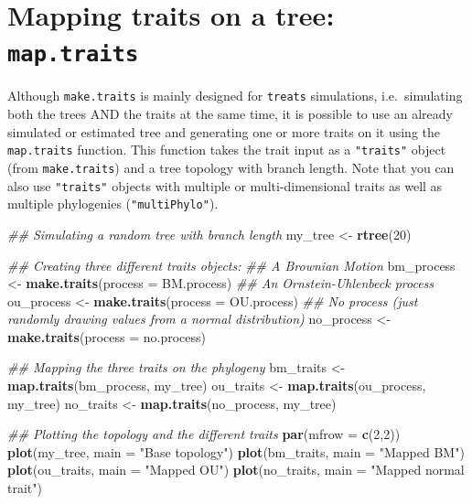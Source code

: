 \documentclass[
]{book}
\newenvironment{Shaded}{\begin{snugshade}}{\end{snugshade}}
\newcommand{\CommentTok}[1]{\textcolor[rgb]{0.56,0.35,0.01}{\textit{#1}}}
\newcommand{\DataTypeTok}[1]{\textcolor[rgb]{0.13,0.29,0.53}{#1}}
\newcommand{\DecValTok}[1]{\textcolor[rgb]{0.00,0.00,0.81}{#1}}
\newcommand{\KeywordTok}[1]{\textcolor[rgb]{0.13,0.29,0.53}{\textbf{#1}}}
\newcommand{\NormalTok}[1]{#1}
\newcommand{\StringTok}[1]{\textcolor[rgb]{0.31,0.60,0.02}{#1}}
\begin{document}
\hypertarget{mapping-traits-on-a-tree-map.traits}{%
\section{\texorpdfstring{Mapping traits on a tree: \texttt{map.traits}}{Mapping traits on a tree: map.traits}}\label{mapping-traits-on-a-tree-map.traits}}

Although \texttt{make.traits} is mainly designed for \texttt{treats} simulations, i.e.~simulating both the trees AND the traits at the same time, it is possible to use an already simulated or estimated tree and generating one or more traits on it using the \texttt{map.traits} function. This function takes the trait input as a \texttt{"traits"} object (from \texttt{make.traits}) and a tree topology with branch length. Note that you can also use \texttt{"traits"} objects with multiple or multi-dimensional traits as well as multiple phylogenies (\texttt{"multiPhylo"}).

\begin{Shaded}
\begin{Highlighting}[]
\CommentTok{\#\# Simulating a random tree with branch length}
\NormalTok{my\_tree \textless{}{-}}\StringTok{ }\KeywordTok{rtree}\NormalTok{(}\DecValTok{20}\NormalTok{)}

\CommentTok{\#\# Creating three different traits objects:}
\CommentTok{\#\# A Brownian Motion}
\NormalTok{bm\_process \textless{}{-}}\StringTok{ }\KeywordTok{make.traits}\NormalTok{(}\DataTypeTok{process =}\NormalTok{ BM.process)}
\CommentTok{\#\# An Ornstein{-}Uhlenbeck process}
\NormalTok{ou\_process \textless{}{-}}\StringTok{ }\KeywordTok{make.traits}\NormalTok{(}\DataTypeTok{process =}\NormalTok{ OU.process)}
\CommentTok{\#\# No process (just randomly drawing values from a normal distribution)}
\NormalTok{no\_process \textless{}{-}}\StringTok{ }\KeywordTok{make.traits}\NormalTok{(}\DataTypeTok{process =}\NormalTok{ no.process)}

\CommentTok{\#\# Mapping the three traits on the phylogeny}
\NormalTok{bm\_traits \textless{}{-}}\StringTok{ }\KeywordTok{map.traits}\NormalTok{(bm\_process, my\_tree)}
\NormalTok{ou\_traits \textless{}{-}}\StringTok{ }\KeywordTok{map.traits}\NormalTok{(ou\_process, my\_tree)}
\NormalTok{no\_traits \textless{}{-}}\StringTok{ }\KeywordTok{map.traits}\NormalTok{(no\_process, my\_tree)}

\CommentTok{\#\# Plotting the topology and the different traits}
\KeywordTok{par}\NormalTok{(}\DataTypeTok{mfrow =} \KeywordTok{c}\NormalTok{(}\DecValTok{2}\NormalTok{,}\DecValTok{2}\NormalTok{))}
\KeywordTok{plot}\NormalTok{(my\_tree, }\DataTypeTok{main =} \StringTok{"Base topology"}\NormalTok{)}
\KeywordTok{plot}\NormalTok{(bm\_traits, }\DataTypeTok{main =} \StringTok{"Mapped BM"}\NormalTok{)}
\KeywordTok{plot}\NormalTok{(ou\_traits, }\DataTypeTok{main =} \StringTok{"Mapped OU"}\NormalTok{)}
\KeywordTok{plot}\NormalTok{(no\_traits, }\DataTypeTok{main =} \StringTok{"Mapped normal trait"}\NormalTok{)}
\end{Highlighting}
\end{Shaded}
\end{document}
